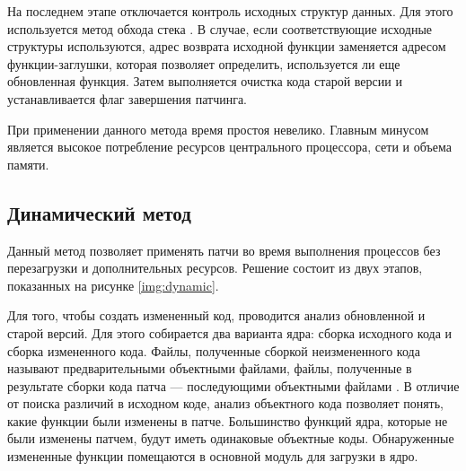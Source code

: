 На последнем этапе отключается контроль исходных структур данных. Для этого используется метод обхода стека \cite{lucos}. В случае, если соответствующие исходные структуры используются, адрес возврата исходной функции заменяется адресом функции-заглушки, которая позволяет определить, используется ли еще обновленная функция. Затем выполняется очистка кода старой версии и устанавливается флаг завершения патчинга.

При применении данного метода время простоя невелико. Главным минусом является высокое потребление ресурсов центрального процессора, сети и объема памяти.

\subsection{Динамический метод}

Данный метод \cite{dynamos} позволяет применять патчи во время выполнения процессов без перезагрузки и дополнительных ресурсов. Решение состоит из двух этапов, показанных на рисунке \ref{img:dynamic}.

Для того, чтобы создать измененный код, проводится анализ обновленной и старой	версий. Для этого собирается два варианта ядра: сборка исходного кода и сборка измененного кода. Файлы, полученные сборкой неизмененного кода называют предварительными объектными файлами, файлы, полученные в результате сборки кода патча --- последующими объектными файлами \cite{ksplice}. В отличие от поиска различий в исходном коде, анализ объектного кода позволяет понять, какие функции были изменены в патче. Большинство функций ядра, которые не были изменены патчем, будут иметь одинаковые объектные коды. Обнаруженные измененные функции помещаются в основной модуль для загрузки в ядро.

